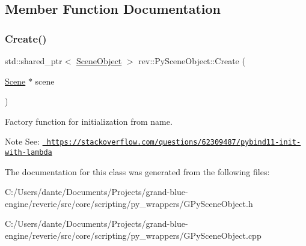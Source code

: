 \subsection{Member Function Documentation}
\mbox{\label{classrev_1_1_py_scene_object_a4ecffceb96613e99540c4fe42077bb7b}} 
\subsubsection{\texorpdfstring{Create()}{Create()}}
{\footnotesize\ttfamily std\+::shared\+\_\+ptr$<$ \mbox{\hyperlink{classrev_1_1_scene_object}{Scene\+Object}} $>$ rev\+::\+Py\+Scene\+Object\+::\+Create (\begin{DoxyParamCaption}\item[{\mbox{\hyperlink{classrev_1_1_scene}{Scene}} $\ast$}]{scene }\end{DoxyParamCaption})\hspace{0.3cm}{\ttfamily [static]}}



Factory function for initialization from name. 

\begin{DoxyNote}{Note}
See\+: \href{https://stackoverflow.com/questions/62309487/pybind11-init-with-lambda}{\texttt{ https\+://stackoverflow.\+com/questions/62309487/pybind11-\/init-\/with-\/lambda}} 
\end{DoxyNote}


The documentation for this class was generated from the following files\+:\begin{DoxyCompactItemize}
\item 
C\+:/\+Users/dante/\+Documents/\+Projects/grand-\/blue-\/engine/reverie/src/core/scripting/py\+\_\+wrappers/G\+Py\+Scene\+Object.\+h\item 
C\+:/\+Users/dante/\+Documents/\+Projects/grand-\/blue-\/engine/reverie/src/core/scripting/py\+\_\+wrappers/G\+Py\+Scene\+Object.\+cpp\end{DoxyCompactItemize}
